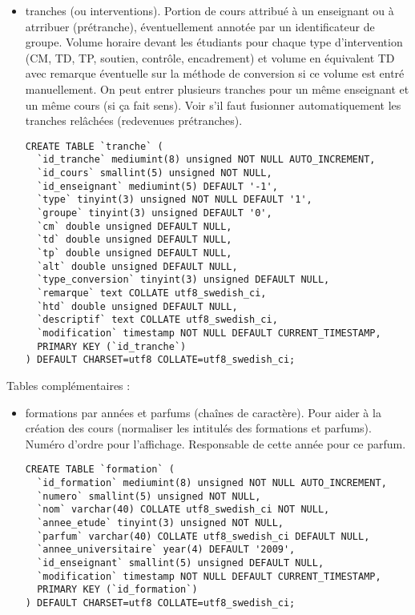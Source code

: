 \documentclass{article}
\begin{document}
\begin{itemize}
\begin{verbatim}
\end{verbatim}


\item tranches (ou interventions). Portion de cours attribué à un enseignant ou à atrribuer (prétranche), éventuellement annotée par un identificateur de groupe. Volume horaire devant les étudiants pour chaque type d'intervention (CM, TD, TP, soutien, contrôle, encadrement)  et volume en équivalent TD avec remarque éventuelle sur la méthode de conversion si ce volume est entré manuellement. On peut entrer plusieurs tranches pour un même enseignant et un même cours (si ça fait sens). Voir s'il faut fusionner automatiquement les tranches relâchées (redevenues prétranches). 
\begin{verbatim}
CREATE TABLE `tranche` (
  `id_tranche` mediumint(8) unsigned NOT NULL AUTO_INCREMENT,
  `id_cours` smallint(5) unsigned NOT NULL,
  `id_enseignant` mediumint(5) DEFAULT '-1',
  `type` tinyint(3) unsigned NOT NULL DEFAULT '1',
  `groupe` tinyint(3) unsigned DEFAULT '0',
  `cm` double unsigned DEFAULT NULL,
  `td` double unsigned DEFAULT NULL,
  `tp` double unsigned DEFAULT NULL,
  `alt` double unsigned DEFAULT NULL,
  `type_conversion` tinyint(3) unsigned DEFAULT NULL,
  `remarque` text COLLATE utf8_swedish_ci,
  `htd` double unsigned DEFAULT NULL,
  `descriptif` text COLLATE utf8_swedish_ci,
  `modification` timestamp NOT NULL DEFAULT CURRENT_TIMESTAMP,
  PRIMARY KEY (`id_tranche`)
) DEFAULT CHARSET=utf8 COLLATE=utf8_swedish_ci;
\end{verbatim}
\end{itemize}

Tables complémentaires :
\begin{itemize}
\item formations par années et parfums (chaînes de caractère). Pour aider à la création des cours (normaliser les intitulés des formations et parfums). Numéro d'ordre pour l'affichage. Responsable de cette année pour ce parfum.

\begin{verbatim}
CREATE TABLE `formation` (
  `id_formation` mediumint(8) unsigned NOT NULL AUTO_INCREMENT,
  `numero` smallint(5) unsigned NOT NULL,
  `nom` varchar(40) COLLATE utf8_swedish_ci NOT NULL,
  `annee_etude` tinyint(3) unsigned NOT NULL,
  `parfum` varchar(40) COLLATE utf8_swedish_ci DEFAULT NULL,
  `annee_universitaire` year(4) DEFAULT '2009',
  `id_enseignant` smallint(5) unsigned DEFAULT NULL,
  `modification` timestamp NOT NULL DEFAULT CURRENT_TIMESTAMP,
  PRIMARY KEY (`id_formation`)
) DEFAULT CHARSET=utf8 COLLATE=utf8_swedish_ci;

\end{verbatim}
\end{itemize}
\end{document}
